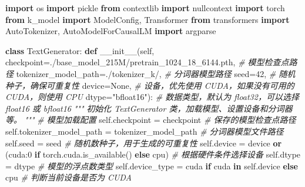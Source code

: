 \documentclass[
]{article}
\newenvironment{Shaded}{}{}
\newcommand{\CommentTok}[1]{\textcolor[rgb]{0.38,0.63,0.69}{\textit{#1}}}
\newcommand{\ControlFlowTok}[1]{\textcolor[rgb]{0.00,0.44,0.13}{\textbf{#1}}}
\newcommand{\DecValTok}[1]{\textcolor[rgb]{0.25,0.63,0.44}{#1}}
\newcommand{\FunctionTok}[1]{\textcolor[rgb]{0.02,0.16,0.49}{#1}}
\newcommand{\ImportTok}[1]{\textcolor[rgb]{0.00,0.50,0.00}{\textbf{#1}}}
\newcommand{\KeywordTok}[1]{\textcolor[rgb]{0.00,0.44,0.13}{\textbf{#1}}}
\newcommand{\NormalTok}[1]{#1}
\newcommand{\OperatorTok}[1]{\textcolor[rgb]{0.40,0.40,0.40}{#1}}
\newcommand{\StringTok}[1]{\textcolor[rgb]{0.25,0.44,0.63}{#1}}
\newcommand{\VariableTok}[1]{\textcolor[rgb]{0.10,0.09,0.49}{#1}}
\begin{document}
\begin{Shaded}
\begin{Highlighting}[]
\ImportTok{import}\NormalTok{ os}
\ImportTok{import}\NormalTok{ pickle}
\ImportTok{from}\NormalTok{ contextlib }\ImportTok{import}\NormalTok{ nullcontext}
\ImportTok{import}\NormalTok{ torch}
\ImportTok{from}\NormalTok{ k\_model }\ImportTok{import}\NormalTok{ ModelConfig, Transformer}
\ImportTok{from}\NormalTok{ transformers }\ImportTok{import}\NormalTok{ AutoTokenizer, AutoModelForCausalLM}
\ImportTok{import}\NormalTok{ argparse}

\KeywordTok{class}\NormalTok{ TextGenerator:}
    \KeywordTok{def} \FunctionTok{\_\_init\_\_}\NormalTok{(}\VariableTok{self}\NormalTok{, }
\NormalTok{                 checkpoint}\OperatorTok{=}\StringTok{\textquotesingle{}./base\_model\_215M/pretrain\_1024\_18\_6144.pth\textquotesingle{}}\NormalTok{,  }\CommentTok{\# 模型检查点路径}
\NormalTok{                 tokenizer\_model\_path}\OperatorTok{=}\StringTok{\textquotesingle{}./tokenizer\_k/\textquotesingle{}}\NormalTok{,  }\CommentTok{\# 分词器模型路径}
\NormalTok{                 seed}\OperatorTok{=}\DecValTok{42}\NormalTok{,  }\CommentTok{\# 随机种子，确保可重复性}
\NormalTok{                 device}\OperatorTok{=}\VariableTok{None}\NormalTok{,  }\CommentTok{\# 设备，优先使用 CUDA，如果没有可用的 CUDA，则使用 CPU}
\NormalTok{                 dtype}\OperatorTok{=}\StringTok{"bfloat16"}\NormalTok{):  }\CommentTok{\# 数据类型，默认为 float32，可以选择 float16 或 bfloat16}
        \CommentTok{"""}
\CommentTok{        初始化 TextGenerator 类，加载模型、设置设备和分词器等。}
\CommentTok{        """}
        \CommentTok{\# 模型加载配置}
        \VariableTok{self}\NormalTok{.checkpoint }\OperatorTok{=}\NormalTok{ checkpoint  }\CommentTok{\# 保存的模型检查点路径}
        \VariableTok{self}\NormalTok{.tokenizer\_model\_path }\OperatorTok{=}\NormalTok{ tokenizer\_model\_path  }\CommentTok{\# 分词器模型文件路径}
        \VariableTok{self}\NormalTok{.seed }\OperatorTok{=}\NormalTok{ seed  }\CommentTok{\# 随机数种子，用于生成的可重复性}
        \VariableTok{self}\NormalTok{.device }\OperatorTok{=}\NormalTok{ device }\KeywordTok{or}\NormalTok{ (}\StringTok{\textquotesingle{}cuda:0\textquotesingle{}} \ControlFlowTok{if}\NormalTok{ torch.cuda.is\_available() }\ControlFlowTok{else} \StringTok{\textquotesingle{}cpu\textquotesingle{}}\NormalTok{)  }\CommentTok{\# 根据硬件条件选择设备}
        \VariableTok{self}\NormalTok{.dtype }\OperatorTok{=}\NormalTok{ dtype  }\CommentTok{\# 模型的浮点数类型}
        \VariableTok{self}\NormalTok{.device\_type }\OperatorTok{=} \StringTok{\textquotesingle{}cuda\textquotesingle{}} \ControlFlowTok{if} \StringTok{\textquotesingle{}cuda\textquotesingle{}} \KeywordTok{in} \VariableTok{self}\NormalTok{.device }\ControlFlowTok{else} \StringTok{\textquotesingle{}cpu\textquotesingle{}}  \CommentTok{\# 判断当前设备是否为 CUDA}
        

\end{Highlighting}
\end{Shaded}
\end{document}
